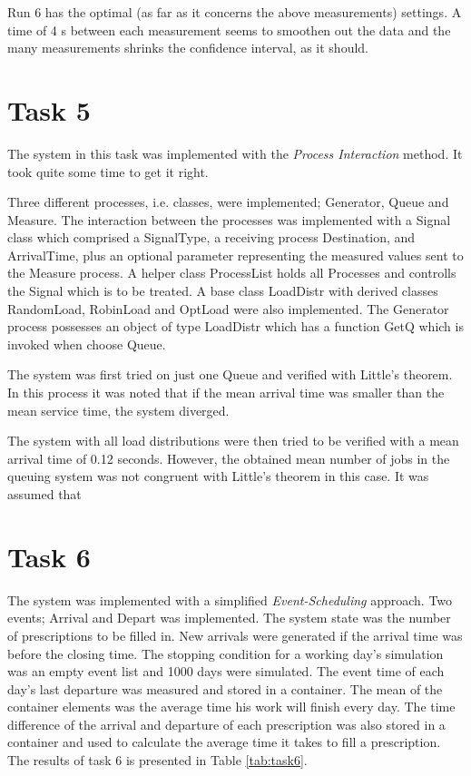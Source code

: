 \documentclass[]{article}
\begin{document}
Run 6 has the optimal (as far as it concerns the above measurements) settings.
A time of 4 s between each measurement seems to smoothen out the data and the many measurements shrinks the confidence interval, as it should.

\section{Task 5}
The system in this task was implemented with the {\it Process Interaction} method.
It took quite some time to get it right.

Three different processes, i.e. classes, were implemented; Generator, Queue and Measure.
The interaction between the processes was implemented with a Signal class which comprised a SignalType, a receiving process Destination, and ArrivalTime, plus an optional parameter representing the measured values sent to the Measure process.
A helper class ProcessList holds all Processes and controlls the Signal which is to be treated.
A base class LoadDistr with derived classes RandomLoad, RobinLoad and OptLoad were also implemented.
The Generator process possesses an object of type LoadDistr which has a function GetQ which is invoked when choose Queue.

The system was first tried on just one Queue and verified with Little's theorem.
In this process it was noted that if the mean arrival time was smaller than the mean service time, the system diverged.

The system with all load distributions were then tried to be verified with a mean arrival time of 0.12 seconds.
However, the obtained mean number of jobs in the queuing system was not congruent with Little's theorem in this case.
It was assumed that









\section{Task 6}
The system was implemented with a simplified {\it Event-Scheduling} approach.
Two events; Arrival and Depart was implemented.
The system state was the number of prescriptions to be filled in.
New arrivals were generated if the arrival time was before the closing time.
The stopping condition for a working day's simulation was an empty event list and 1000 days were simulated.
The event time of each day's last departure was measured and stored in a container.
The mean of the container elements was the average time his work will finish every day.
The time difference of the arrival and departure of each prescription was also stored in a container and used to calculate the average time it takes to fill a prescription.
The results of task 6 is presented in Table \ref{tab:task6}.
\end{document}
